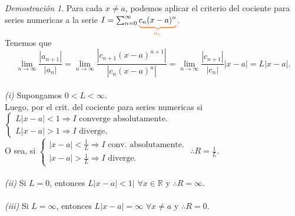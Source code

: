 \documentclass{article}
\theoremstyle{definition}
\theoremstyle{definition}
\theoremstyle{remark}
\newtheorem*{demo}{Demostración}
\begin{document}
\begin{demo}
  Para cada $x\neq a$, podemos aplicar el criterio del cociente para series numericas a la serie $I=\sum_{n=0}^{\infty}{\textcolor{rojop2}{\underbrace{\textcolor{black}{c_n(x-a)^n}}_{a_n}}}$.
\\
Tenemos que \[
  \lim_{n\to\infty}{\frac{\left|a_{n+1}\right|}{\left|a_n\right|}}=\lim_{n\to\infty}{\frac{\left|c_{n+1}(x-a)^{n+1}\right|}{\left|c_n(x-a)^n\right|}}=\lim_{n\to\infty}{\frac{\left|c_{n+1}\right|}{\left|c_n\right|}|x-a|}=L|x-a|.
\]\\
\emph{(i)\phantom{ii}} Supongamos $0<L<\infty$. \\
Luego, por el crit. del cociente para series numericas si $\left\{\begin{array}{l}
    L|x-a|<1 \Rightarrow I \text{ converge absolutamente.} \\
    L|x-a|>1 \Rightarrow I \text{ diverge.}
\end{array}\right.$ \\ 
O sea, si $\left\{\begin{array}{l}
    |x-a|<\frac{1}{L} \Rightarrow I \text{ conv. absolutamente.} \\ 
    |x-a| > \frac{1}{L} \Rightarrow I \text{ diverge}.
\end{array}\right.$ \quad \quad $\therefore R=\frac{1}{L}.$ \\\\
\emph{(ii)\phantom{i}} Si $L=0$,\phantom{,,} entonces $L|x-a|<1|$ $ \forall x \in \mathbb{R}$ y $\therefore R=\infty$. \\ \\
\emph{(iii)} Si $L=\infty$, entonces $L|x-a|=\infty$ $\forall x \neq a$ y $\therefore R=0$.
\end{demo}
\end{document}
